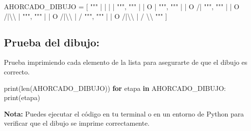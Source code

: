 \documentclass[
  a4paper,
  DIV=11,
  numbers=noendperiod,
  onepage,
  openany]{scrreprt}
\newenvironment{Shaded}{\begin{snugshade}}{\end{snugshade}}
\newcommand{\BuiltInTok}[1]{\textcolor[rgb]{0.00,0.23,0.31}{#1}}
\newcommand{\CharTok}[1]{\textcolor[rgb]{0.13,0.47,0.30}{#1}}
\newcommand{\ControlFlowTok}[1]{\textcolor[rgb]{0.00,0.23,0.31}{\textbf{#1}}}
\newcommand{\KeywordTok}[1]{\textcolor[rgb]{0.00,0.23,0.31}{\textbf{#1}}}
\newcommand{\NormalTok}[1]{\textcolor[rgb]{0.00,0.23,0.31}{#1}}
\newcommand{\OperatorTok}[1]{\textcolor[rgb]{0.37,0.37,0.37}{#1}}
\newcommand{\StringTok}[1]{\textcolor[rgb]{0.13,0.47,0.30}{#1}}
\begin{document}
\begin{Shaded}
\begin{Highlighting}[]
\NormalTok{AHORCADO\_DIBUJO }\OperatorTok{=}\NormalTok{ [}
    \StringTok{"""}
\StringTok{       |}
\StringTok{       |}
\StringTok{       |}
\StringTok{       |}
\StringTok{    """}\NormalTok{,}
    \StringTok{"""}
\StringTok{       |}
\StringTok{       |}
\StringTok{       O}
\StringTok{       |}
\StringTok{    """}\NormalTok{,}
    \StringTok{"""}
\StringTok{       |}
\StringTok{       |}
\StringTok{       O}
\StringTok{      /|}
\StringTok{    """}\NormalTok{,}
    \StringTok{"""}
\StringTok{       |}
\StringTok{       |}
\StringTok{       O}
\StringTok{      /|}\CharTok{\textbackslash{}\textbackslash{}}
\StringTok{       |}
\StringTok{    """}\NormalTok{,}
    \StringTok{"""}
\StringTok{       |}
\StringTok{       |}
\StringTok{       O}
\StringTok{      /|}\CharTok{\textbackslash{}\textbackslash{}}
\StringTok{       |}
\StringTok{      /}
\StringTok{    """}\NormalTok{,}
    \StringTok{"""}
\StringTok{       |}
\StringTok{       |}
\StringTok{       O}
\StringTok{      /|}\CharTok{\textbackslash{}\textbackslash{}}
\StringTok{       |}
\StringTok{      / }\CharTok{\textbackslash{}\textbackslash{}}
\StringTok{    """}
\NormalTok{]}
\end{Highlighting}
\end{Shaded}

\subsection{Prueba del dibujo:}\label{prueba-del-dibujo}

Prueba imprimiendo cada elemento de la lista para asegurarte de que el
dibujo es correcto.

\begin{Shaded}
\begin{Highlighting}[]
\BuiltInTok{print}\NormalTok{(}\BuiltInTok{len}\NormalTok{(AHORCADO\_DIBUJO))}
\ControlFlowTok{for}\NormalTok{ etapa }\KeywordTok{in}\NormalTok{ AHORCADO\_DIBUJO:}
    \BuiltInTok{print}\NormalTok{(etapa)}
\end{Highlighting}
\end{Shaded}

\begin{tcolorbox}[enhanced jigsaw, bottomrule=.15mm, title=\textcolor{quarto-callout-tip-color}{\faLightbulb}\hspace{0.5em}{Tip}, colbacktitle=quarto-callout-tip-color!10!white, opacityback=0, breakable, coltitle=black, bottomtitle=1mm, leftrule=.75mm, titlerule=0mm, arc=.35mm, rightrule=.15mm, toptitle=1mm, left=2mm, opacitybacktitle=0.6, toprule=.15mm, colframe=quarto-callout-tip-color-frame, colback=white]

\textbf{Nota:} Puedes ejecutar el código en tu terminal o en un entorno
de Python para verificar que el dibujo se imprime correctamente.

\end{tcolorbox}
\end{document}
